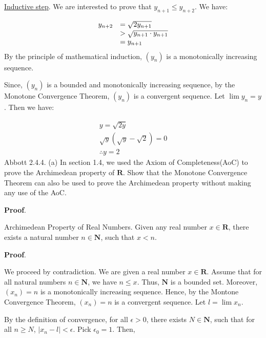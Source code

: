 \documentclass[10pt]{article}
\begin{document}
\underline{Inductive step}. We are interested to prove that $\displaystyle y_{n+1} \leq y_{n+2}$. We have:


\begin{equation*}
\begin{array}{ c l }
y_{n+2} & =\sqrt{2y_{n+1}}\\
 &  >\sqrt{y_{n+1} \cdot y_{n+1}}\\
 & =y_{n+1}
\end{array}
\end{equation*}
By the principle of mathematical induction, $\displaystyle ( y_{n})$ is a monotonically increasing sequence. 



Since, $\displaystyle ( y_{n})$ is a bounded and monotonically increasing sequence, by the Monotone Convergence Theorem, $\displaystyle ( y_{n})$ is a convergent sequence. Let $\displaystyle \lim y_{n} =y$. Then we have:


\begin{gather*}
y=\sqrt{2y}\\
\sqrt{y}\left(\sqrt{y} -\sqrt{2}\right) =0\\
\therefore y=2
\end{gather*}
Abbott 2.4.4. (a) In section 1.4, we used the Axiom of Completeness(AoC) to prove the Archimedean property of $\displaystyle \mathbf{R}$. Show that the Monotone Convergence Theorem can also be used to prove the Archimedean property without making any use of the AoC.



\textbf{Proof}.



Archimedean Property of Real Numbers. Given any real number $\displaystyle x\in \mathbf{R}$, there exists a natural number $\displaystyle n\in \mathbf{N}$, such that $\displaystyle x< n$.



\textbf{Proof}.

We proceed by contradiction. We are given a real number $\displaystyle x\in \mathbf{R}$. Assume that for all natural numbers $\displaystyle n\in \mathbf{N}$, we have $\displaystyle n\leq x$. Thus, $\displaystyle \mathbf{N}$ is a bounded set. Moreover, $\displaystyle ( x_{n}) =n$ is a monotonically increasing sequence. Hence, by the Montone Convergence Theorem, $\displaystyle ( x_{n}) =n$ is a convergent sequence. Let $\displaystyle l=\lim x_{n}$.



By the definition of convergence, for all $\displaystyle \epsilon  >0$, there exists $\displaystyle N\in \mathbf{N}$, such that for all $\displaystyle n\geq N$, $\displaystyle |x_{n} -l|< \epsilon $. Pick $\displaystyle \epsilon _{0} =1$. Then,
\end{document}
